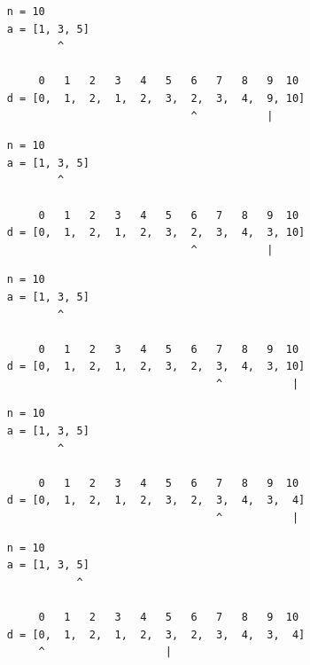 \begin{frame}[fragile]
\begin{verbatim}
     n = 10
     a = [1, 3, 5]
             ^

          0   1   2   3   4   5   6   7   8   9  10
     d = [0,  1,  2,  1,  2,  3,  2,  3,  4,  9, 10]
                                  ^           |
\end{verbatim}
\end{frame}
\addtocounter{framenumber}{-1}

\begin{frame}[fragile]
\begin{verbatim}
     n = 10
     a = [1, 3, 5]
             ^

          0   1   2   3   4   5   6   7   8   9  10
     d = [0,  1,  2,  1,  2,  3,  2,  3,  4,  3, 10]
                                  ^           |
\end{verbatim}
\end{frame}
\addtocounter{framenumber}{-1}

\begin{frame}[fragile]
\begin{verbatim}
     n = 10
     a = [1, 3, 5]
             ^

          0   1   2   3   4   5   6   7   8   9  10
     d = [0,  1,  2,  1,  2,  3,  2,  3,  4,  3, 10]
                                      ^           |
\end{verbatim}
\end{frame}
\addtocounter{framenumber}{-1}

\begin{frame}[fragile]
\begin{verbatim}
     n = 10
     a = [1, 3, 5]
             ^

          0   1   2   3   4   5   6   7   8   9  10
     d = [0,  1,  2,  1,  2,  3,  2,  3,  4,  3,  4]
                                      ^           |
\end{verbatim}
\end{frame}
\addtocounter{framenumber}{-1}

\begin{frame}[fragile]
\begin{verbatim}
     n = 10
     a = [1, 3, 5]
                ^

          0   1   2   3   4   5   6   7   8   9  10
     d = [0,  1,  2,  1,  2,  3,  2,  3,  4,  3,  4]
          ^                   |
\end{verbatim}
\end{frame}
\addtocounter{framenumber}{-1}


